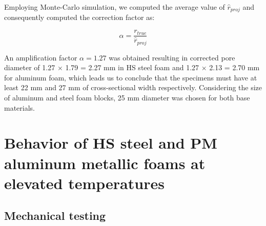 \documentclass[review]{elsarticle}
\begin{document}
Employing Monte-Carlo simulation, we computed the average value of $\hat{r}_{proj}$  and consequently computed the correction factor as:

\begin{equation}\label{Eq12}
\alpha=\frac{r_{true}}{\hat{r}_{proj}}
\end{equation}

An amplification factor $\alpha=1.27$ was obtained resulting in corrected pore diameter of 1.27 $\times$ 1.79 = 2.27 mm in HS steel foam and 1.27 $\times$ 2.13 = 2.70 mm for aluminum foam, which leads us to conclude that the specimens must have at least 22 mm and 27 mm of cross-sectional width respectively. Considering the size of aluminum and steel foam blocks, 25 mm diameter was chosen for both base materials.


\section{Behavior of HS steel and PM aluminum metallic foams at elevated temperatures}

\subsection*{Mechanical testing}
\end{document}

